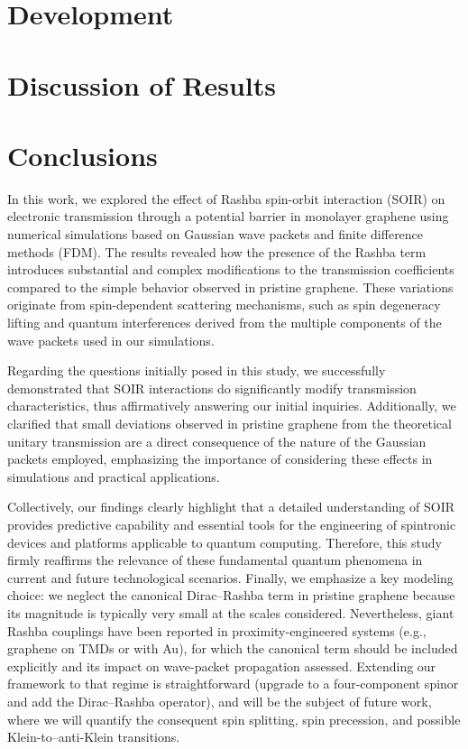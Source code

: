 \documentclass{../assets/templates/iopjournal}
\begin{document}


    \section{Development}\label{sec:development}
    


    \section{Discussion of Results}\label{sec:discussion-of-results}
    


    \section{Conclusions}\label{sec:conclusions}

    In this work, we explored the effect of Rashba spin-orbit interaction (SOIR) on electronic transmission through a potential barrier in monolayer graphene using numerical simulations based on Gaussian wave packets and finite difference methods (FDM). The results revealed how the presence of the Rashba term introduces substantial and complex modifications to the transmission coefficients compared to the simple behavior observed in pristine graphene.
    These variations originate from spin-dependent scattering mechanisms, such as spin degeneracy lifting and quantum interferences derived from the multiple components of the wave packets used in our simulations.

    Regarding the questions initially posed in this study, we successfully demonstrated that SOIR interactions do significantly modify transmission characteristics, thus affirmatively answering our initial inquiries.
    Additionally, we clarified that small deviations observed in pristine graphene from the theoretical unitary transmission are a direct consequence of the nature of the Gaussian packets employed, emphasizing the importance of considering these effects in simulations and practical applications.

    Collectively, our findings clearly highlight that a detailed understanding of SOIR provides predictive capability and essential tools for the engineering of spintronic devices and platforms applicable to quantum computing.
    Therefore, this study firmly reaffirms the relevance of these fundamental quantum phenomena in current and future technological scenarios.
    Finally, we emphasize a key modeling choice: we neglect the canonical Dirac–Rashba term in pristine graphene because its magnitude is typically very small at the scales considered.
    Nevertheless, giant Rashba couplings have been reported in proximity-engineered systems (e.g., graphene on TMDs or with Au), for which the canonical term should be included explicitly and its impact on wave-packet propagation assessed.
    Extending our framework to that regime is straightforward (upgrade to a four-component spinor and add the Dirac–Rashba operator), and will be the subject of future work, where we will quantify the consequent spin splitting, spin precession, and possible Klein-to–anti-Klein transitions\cite{AvsarNatCommun2014, WangPhysRevX2016, DellAnnaJPhysCondMatt2018}.
\end{document}
